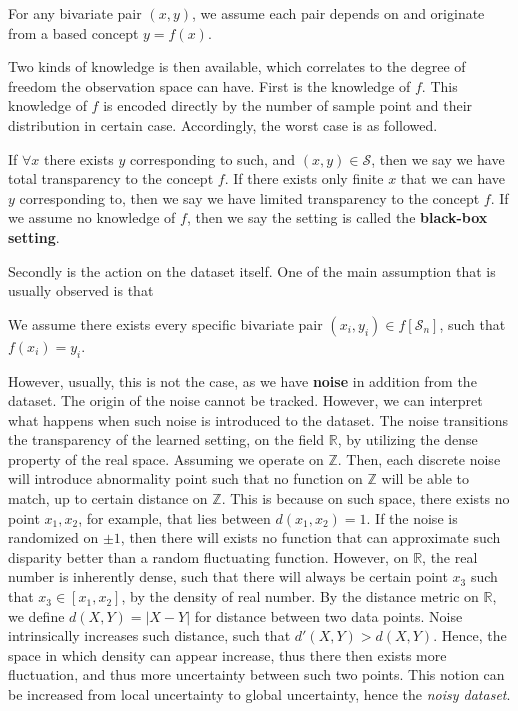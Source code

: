 \begin{assumption}[Transparency]
    For any bivariate pair $(x,y)$, we assume each pair depends on and originate from a based concept $y=f(x)$. 
\end{assumption}

Two kinds of knowledge is then available, which correlates to the degree of freedom the observation space can have. First is the knowledge of $f$. This knowledge of $f$ is encoded directly by the number of sample point and their distribution in certain case. Accordingly, the worst case is as followed. 

\begin{conjecture}
    If $\forall x$ there exists $y$ corresponding to such, and $(x,y)\in \mathcal{S}$, then we say we have total transparency to the concept $f$. If there exists only finite $x$ that we can have $y$ corresponding to, then we say we have limited transparency to the concept $f$. If we assume no knowledge of $f$, then we say the setting is called the \textbf{black-box setting}. 
\end{conjecture}

Secondly is the action on the dataset itself. One of the main assumption that is usually observed is that 

\begin{assumption}[Fallacy]
    We assume there exists every specific bivariate pair $(x_{i},y_{i})\in f[\mathcal{S}_{n}]$, such that $f(x_{i})=y_{i}$. 
\end{assumption}

However, usually, this is not the case, as we have \textbf{noise} in addition from the dataset. The origin of the noise cannot be tracked. However, we can interpret what happens when such noise is introduced to the dataset. The noise transitions the transparency of the learned setting, on the field $\mathbb{R}$, by utilizing the dense property of the real space. Assuming we operate on $\mathbb{Z}$. Then, each discrete noise will introduce abnormality point such that no function on $\mathbb{Z}$ will be able to match, up to certain distance on $\mathbb{Z}$. This is because on such space, there exists no point $x_1, x_{2}$, for example, that lies between $d(x_{1},x_{2})=1$. If the noise is randomized on $\pm 1$, then there will exists no function that can approximate such disparity better than a random fluctuating function. However, on $\mathbb{R}$, the real number is inherently dense, such that there will always be certain point $x_{3}$ such that $x_{3}\in [x_{1},x_{2}]$, by the density of real number. By the distance metric on $\mathbb{R}$, we define $d(X,Y)=|X-Y|$ for distance between two data points. Noise intrinsically increases such distance, such that $d'(X,Y)> d(X,Y)$. Hence, the space in which density can appear increase, thus there then exists more fluctuation, and thus more uncertainty between such two points. This notion can be increased from local uncertainty to global uncertainty, hence the \textit{noisy dataset}. 

